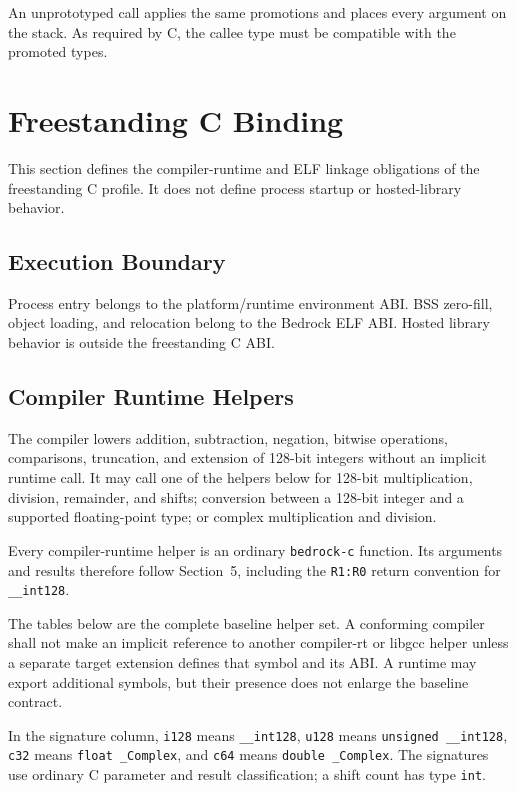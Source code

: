 \documentclass[10pt,twoside]{article}
\begin{document}
An unprototyped call applies the same promotions and places every argument on
the stack. As required by C, the callee type must be compatible with the
promoted types.

\section{Freestanding C Binding}\label{page:freestanding-c-binding}
This section defines the compiler-runtime and ELF linkage obligations of the
freestanding C profile. It does not define process startup or hosted-library
behavior.

\subsection{Execution Boundary}
Process entry belongs to the platform/runtime environment ABI. BSS zero-fill,
object loading, and relocation belong to the Bedrock ELF ABI. Hosted library
behavior is outside the freestanding C ABI.

\subsection{Compiler Runtime Helpers}
The compiler lowers addition, subtraction, negation, bitwise operations,
comparisons, truncation, and extension of 128-bit integers without an implicit
runtime call. It may call one of the helpers below for 128-bit multiplication,
division, remainder, and shifts; conversion between a 128-bit integer and a
supported floating-point type; or complex multiplication and division.

Every compiler-runtime helper is an ordinary \texttt{bedrock-c} function. Its
arguments and results therefore follow Section~5, including the
\texttt{R1:R0} return convention for \texttt{\_\_int128}.

The tables below are the complete baseline helper set. A conforming compiler shall not make an
implicit reference to another compiler-rt or libgcc helper unless a separate
target extension defines that symbol and its ABI. A runtime may export
additional symbols, but their presence does not enlarge the baseline contract.

In the signature column, \texttt{i128} means \texttt{\_\_int128},
\texttt{u128} means \texttt{unsigned \_\_int128}, \texttt{c32} means
\texttt{float \_Complex}, and \texttt{c64} means
\texttt{double \_Complex}. The signatures use ordinary C parameter and result
classification; a shift count has type \texttt{int}.
\end{document}
